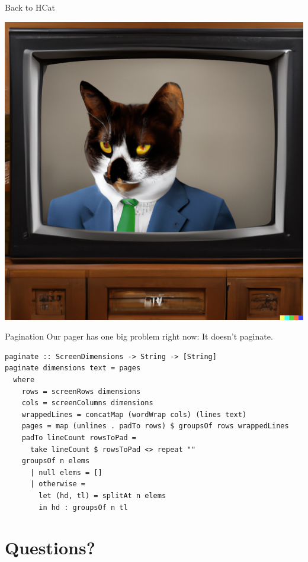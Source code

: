 \documentclass[10pt, presentation, colorlinks]{beamer}
\begin{document}
\begin{frame}[label={sec:org0ac3282}]{Back to HCat}
\begin{center}
\includegraphics[height=0.6\textheight]{img/regularly-scheduled-hcat.png}
\end{center}
\end{frame}

\begin{frame}[label={sec:org63d6816},fragile]{Pagination}
 Our pager has one big problem right now: It doesn't paginate.

\pause

\begin{verbatim}
paginate :: ScreenDimensions -> String -> [String]
paginate dimensions text = pages
  where
    rows = screenRows dimensions
    cols = screenColumns dimensions
    wrappedLines = concatMap (wordWrap cols) (lines text)
    pages = map (unlines . padTo rows) $ groupsOf rows wrappedLines
    padTo lineCount rowsToPad =
      take lineCount $ rowsToPad <> repeat ""
    groupsOf n elems
      | null elems = []
      | otherwise =
        let (hd, tl) = splitAt n elems
        in hd : groupsOf n tl
\end{verbatim}
\end{frame}

\section{Questions?}
\label{sec:orge24e16e}
\end{document}
